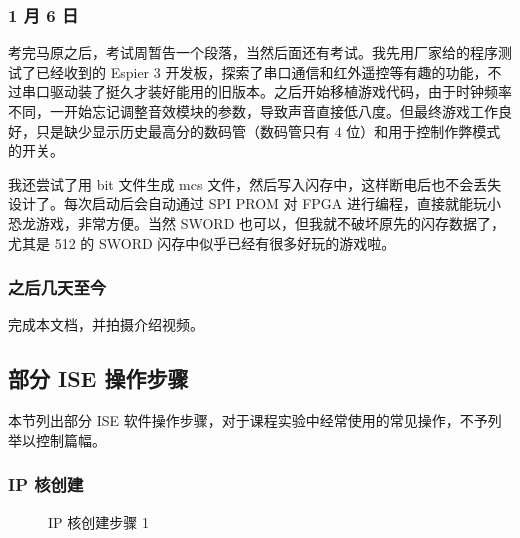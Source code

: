 \documentclass[hyperref,UTF8,12pt,a4paper]{ctexart}
\begin{document}
\hypertarget{ux6708-6-ux65e5}{%
\subsubsection{1 月 6 日}\label{ux6708-6-ux65e5}}

考完马原之后，考试周暂告一个段落，当然后面还有考试。我先用厂家给的程序测试了已经收到的
Espier 3
开发板，探索了串口通信和红外遥控等有趣的功能，不过串口驱动装了挺久才装好能用的旧版本。之后开始移植游戏代码，由于时钟频率不同，一开始忘记调整音效模块的参数，导致声音直接低八度。但最终游戏工作良好，只是缺少显示历史最高分的数码管（数码管只有
4 位）和用于控制作弊模式的开关。

我还尝试了用 bit 文件生成 mcs
文件，然后写入闪存中，这样断电后也不会丢失设计了。每次启动后会自动通过
SPI PROM 对 FPGA 进行编程，直接就能玩小恐龙游戏，非常方便。当然 SWORD
也可以，但我就不破坏原先的闪存数据了，尤其是 512 的 SWORD
闪存中似乎已经有很多好玩的游戏啦。

\hypertarget{ux4e4bux540eux51e0ux5929ux81f3ux4eca}{%
\subsubsection{之后几天至今}\label{ux4e4bux540eux51e0ux5929ux81f3ux4eca}}

完成本文档，并拍摄介绍视频。

\hypertarget{ux90e8ux5206-ise-ux64cdux4f5cux6b65ux9aa4}{%
\subsection{部分 ISE
操作步骤}\label{ux90e8ux5206-ise-ux64cdux4f5cux6b65ux9aa4}}

本节列出部分 ISE
软件操作步骤，对于课程实验中经常使用的常见操作，不予列举以控制篇幅。

\hypertarget{ip-ux6838ux521bux5efa}{%
\subsubsection{IP 核创建}\label{ip-ux6838ux521bux5efa}}

\begin{figure}[H]
\centering
{}
\caption{IP 核创建步骤 1}
\end{figure}
\end{document}
